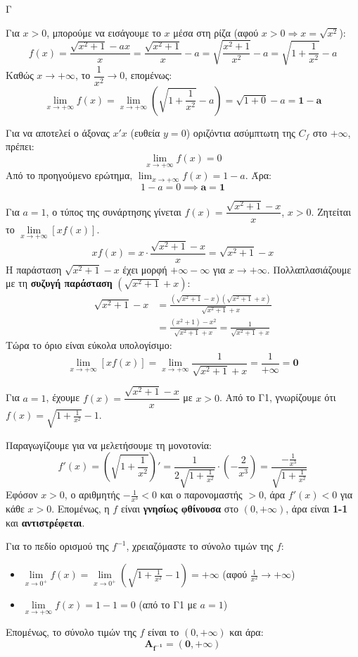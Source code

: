 \begin{thema}{Γ}
\begin{erwthma}
\item Για $x > 0$, μπορούμε να εισάγουμε το $x$ μέσα στη ρίζα (αφού $x > 0 \Rightarrow x = \sqrt{x^2}$):
\[ f(x) = \frac{\sqrt{x^2+1} - ax}{x} = \frac{\sqrt{x^2+1}}{x} - a = \sqrt{\frac{x^2+1}{x^2}} - a = \sqrt{1 + \frac{1}{x^2}} - a \]
Καθώς $x \to +\infty$, το $\dfrac{1}{x^2} \to 0$, επομένως:
\[ \lim_{x \to +\infty} f(x) = \lim_{x \to +\infty} \left( \sqrt{1 + \frac{1}{x^2}} - a \right) = \sqrt{1+0} - a = \boldsymbol{1 - a} \]

\item Για να αποτελεί ο άξονας $x'x$ (ευθεία $y=0$) οριζόντια ασύμπτωτη της $C_f$ στο $+\infty$, πρέπει:
\[ \lim_{x \to +\infty} f(x) = 0 \]
Από το προηγούμενο ερώτημα, $\lim_{x \to +\infty} f(x) = 1 - a$. Άρα:
\[ 1 - a = 0 \implies \boldsymbol{a = 1} \]

\item Για $a = 1$, ο τύπος της συνάρτησης γίνεται $f(x) = \dfrac{\sqrt{x^2+1} - x}{x}$, $x > 0$. Ζητείται το $\lim\limits_{x \to +\infty} [x f(x)]$.
\[ x f(x) = x \cdot \frac{\sqrt{x^2+1} - x}{x} = \sqrt{x^2+1} - x \]
Η παράσταση $\sqrt{x^2+1} - x$ έχει μορφή $+\infty - \infty$ για $x \to +\infty$.
Πολλαπλασιάζουμε με τη \textbf{συζυγή παράσταση} $(\sqrt{x^2+1} + x)$:
\begin{align*}
\sqrt{x^2+1} - x &= \frac{(\sqrt{x^2+1} - x)(\sqrt{x^2+1} + x)}{\sqrt{x^2+1} + x} \\
&= \frac{(x^2+1) - x^2}{\sqrt{x^2+1} + x} = \frac{1}{\sqrt{x^2+1} + x}
\end{align*}
Τώρα το όριο είναι εύκολα υπολογίσιμο:
\[ \lim_{x \to +\infty} [x f(x)] = \lim_{x \to +\infty} \frac{1}{\sqrt{x^2+1} + x} = \frac{1}{+\infty} = \boldsymbol{0} \]

\item Για $a = 1$, έχουμε $f(x) = \dfrac{\sqrt{x^2+1}-x}{x}$ με $x > 0$.
Από το Γ1, γνωρίζουμε ότι $f(x) = \sqrt{1+\frac{1}{x^2}} - 1$.

Παραγωγίζουμε για να μελετήσουμε τη μονοτονία:
\[ f'(x) = \left( \sqrt{1+\frac{1}{x^2}} \right)' = \frac{1}{2\sqrt{1+\frac{1}{x^2}}} \cdot \left( -\frac{2}{x^3} \right) = \frac{-\frac{1}{x^3}}{\sqrt{1+\frac{1}{x^2}}} \]
Εφόσον $x > 0$, ο αριθμητής $-\frac{1}{x^3} < 0$ και ο παρονομαστής $> 0$, άρα $f'(x) < 0$ για κάθε $x > 0$.
Επομένως, η $f$ είναι \textbf{γνησίως φθίνουσα} στο $(0, +\infty)$, άρα είναι \textbf{1-1} και \textbf{αντιστρέφεται}.

Για το πεδίο ορισμού της $f^{-1}$, χρειαζόμαστε το σύνολο τιμών της $f$:
\begin{itemize}
    \item $\lim\limits_{x \to 0^+} f(x) = \lim\limits_{x \to 0^+} \left( \sqrt{1+\frac{1}{x^2}} - 1 \right) = +\infty$ \quad (αφού $\frac{1}{x^2} \to +\infty$)
    \item $\lim\limits_{x \to +\infty} f(x) = 1 - 1 = 0$ \quad (από το Γ1 με $a=1$)
\end{itemize}
Επομένως, το σύνολο τιμών της $f$ είναι το $(0, +\infty)$ και άρα:
\[ \boldsymbol{A_{f^{-1}} = (0, +\infty)} \]
\end{erwthma}
\end{thema}
